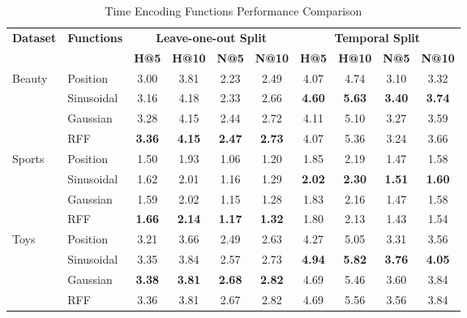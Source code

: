 \documentclass[sigconf,nonacm]{acmart}
\begin{document}
\begin{table}[htbp]
\centering
\caption{Time Encoding Functions Performance Comparison}
\label{tab:combined_encoding}
\begin{adjustbox}{max width=\columnwidth}
\begin{tabular}{llcccccccc}
\toprule
\multirow{2}{*}{\textbf{Dataset}} & \multirow{2}{*}{\textbf{Functions}} & \multicolumn{4}{c}{\textbf{Leave-one-out Split}} & \multicolumn{4}{c}{\textbf{Temporal Split}} \\
\cmidrule(lr){3-6} \cmidrule(lr){7-10}
& & \textbf{H@5} & \textbf{H@10} & \textbf{N@5} & \textbf{N@10} & \textbf{H@5} & \textbf{H@10} & \textbf{N@5} & \textbf{N@10} \\
\midrule

\multirow{4}{*}{Beauty}
  & Position     & 3.00   & 3.81     & 2.23   & 2.49  & 4.07   & 4.74   & 3.10   & 3.32 \\
  & Sinusoidal   & 3.16   & 4.18     & 2.33   & 2.66  & \textbf{4.60}  & \textbf{5.63}  & \textbf{3.40}  & \textbf{3.74} \\
  & Gaussian     & 3.28   & 4.15     & 2.44   & 2.72  & 4.11   & 5.10  & 3.27   & 3.59 \\
  & RFF          & \textbf{3.36} & \textbf{4.15}  & \textbf{2.47} & \textbf{2.73} & 4.07   & 5.36  & 3.24   & 3.66 \\
\midrule

\multirow{4}{*}{Sports}
  & Position     & 1.50   & 1.93     & 1.06   & 1.20   & 1.85   & 2.19   & 1.47   & 1.58 \\
  & Sinusoidal   & 1.62   & 2.01     & 1.16   & 1.29   & \textbf{2.02}  & \textbf{2.30}  & \textbf{1.51}  & \textbf{1.60} \\
  & Gaussian     & 1.59   & 2.02     & 1.15   & 1.28   & 1.83 & 2.16 & 1.47 & 1.58 \\
  & RFF          & \textbf{1.66} & \textbf{2.14}  & \textbf{1.17} & \textbf{1.32} & 1.80 & 2.13 & 1.43 & 1.54 \\
\midrule

\multirow{4}{*}{Toys}
  & Position     & 3.21   & 3.66    & 2.49   & 2.63  & 4.27   & 5.05   & 3.31   & 3.56 \\
  & Sinusoidal   & 3.35   & 3.84    & 2.57   & 2.73  & \textbf{4.94}  & \textbf{5.82}  & \textbf{3.76}  & \textbf{4.05} \\
  & Gaussian     & \textbf{3.38} & \textbf{3.81}  & \textbf{2.68} & \textbf{2.82}  & 4.69  & 5.46 & 3.60  & 3.84 \\
  & RFF          & 3.36   & 3.81    & 2.67   & 2.82  & 4.69  & 5.56 & 3.56  & 3.84 \\
\midrule


\end{tabular}
\end{adjustbox}
\end{table}
\end{document}
